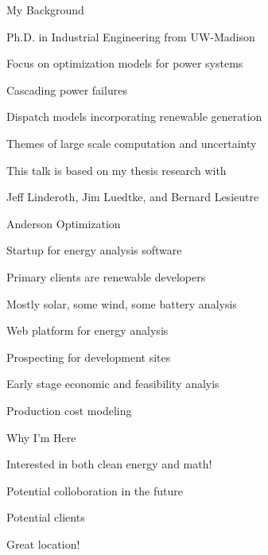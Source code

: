 \begin{frame}{My Background}

\bi
\item Ph.D. in Industrial Engineering from UW-Madison
\item Focus on optimization models for power systems
\bi
\item Cascading power failures
\item Dispatch models incorporating renewable generation
\item Themes of large scale computation and uncertainty
\ei
\item This talk is based on my thesis research with 
\bi
\item Jeff Linderoth, Jim Luedtke, and Bernard Lesieutre
\ei
\ei

\end{frame}
\begin{frame}{Anderson Optimization}

\bi
\item Startup for energy analysis software
\item Primary clients are renewable developers
\bi
\item Mostly solar, some wind, some battery analysis
\ei
\ei
\pause
\bi
\item Web platform for energy analysis
\bi
\item Prospecting for development sites
\item Early stage economic and feasibility analyis
\item Production cost modeling
\ei
\ei

\end{frame}
\begin{frame}{Why I'm Here}

\bi
\item Interested in both clean energy and math!
\item Potential colloboration in the future
\item Potential clients 
\item Great location!
\ei 

\end{frame}